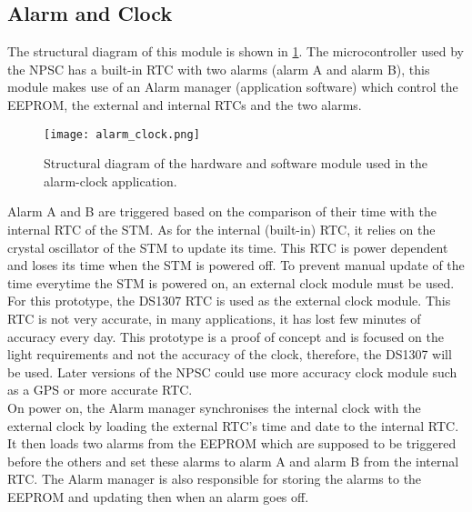 \subsection{Alarm and Clock}
The structural diagram of this module is shown in \cref{fig:alarm_clock}. The microcontroller used by the NPSC has a built-in RTC with two alarms (alarm A and alarm B), this module makes use of an Alarm manager (application software) which control the EEPROM, the external and internal RTCs and the two alarms.
\begin{figure}[ht]
\centering
\texttt{[image: alarm\_clock.png]}
\caption{Structural diagram of the hardware and software module used in the alarm-clock application.}
\label{fig:alarm_clock}
\end{figure}
Alarm A and B are triggered based on the comparison of their time with the internal RTC of the STM. As for the internal (built-in) RTC, it relies on the crystal oscillator of the STM to update its time. This RTC is power dependent and loses its time when the STM is powered off. To prevent manual update of the time everytime the STM is powered on, an external clock module must be used. For this prototype, the DS1307 RTC is used as the external clock module. This RTC is not very accurate, in many applications, it has lost few minutes of accuracy every day. This prototype is a proof of concept and is focused on the light requirements and not the accuracy of the clock, therefore, the DS1307 will be used. Later versions of the NPSC could use more accuracy clock module such as a GPS or more accurate RTC.  \\
On power on, the Alarm manager synchronises the internal clock with the external clock by loading the external RTC's time and date to the internal RTC. It then loads two alarms from the EEPROM which are supposed to be triggered before the others and set these alarms to alarm A and alarm B from the internal RTC. The Alarm manager is also responsible for storing the alarms to the EEPROM and updating then when an alarm goes off. 

